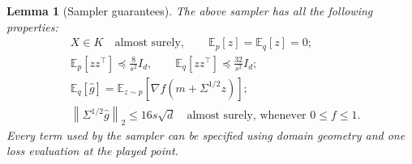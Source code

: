 \documentclass[11pt]{article}
\numberwithin{equation}{section}
\newcommand{\E}{\mathbb E}
\newcommand{\norm}[1]{\left\|#1\right\|}
\newtheorem{lemma}[theorem]{Lemma}
\theoremstyle{definition}
\theoremstyle{remark}
\begin{document}
\begin{lemma}[Sampler guarantees]\label{lem:sampler}
The above sampler has all the following properties:
\begin{align}
 &X\in K\quad\text{almost surely},\qquad \E_p[z]=\E_q[z]=0;\label{eq:feasible}\\
 &\E_p[zz^\top]\preceq\frac8{s^2}I_d,
 \qquad \E_q[zz^\top]\preceq\frac{32}{s^2}I_d;\label{eq:explorecov}\\
 &\E_q[\widehat g]
     =\E_{z\sim p}[\nabla f(m+\Sigma^{1/2}z)];\label{eq:unbiased}\\
 &\norm{\Sigma^{1/2}\widehat g}_2\leq16s\sqrt d
   \quad\text{almost surely, whenever }0\leq f\leq1.\label{eq:boundedlocal}
\end{align}
Every term used by the sampler can be specified using domain geometry and one
loss evaluation at the played point.
\end{lemma}
\end{document}
